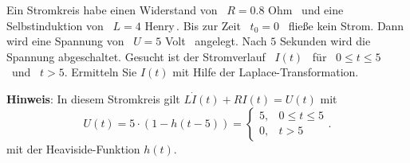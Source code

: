 {
Ein Stromkreis habe einen Widerstand von \ $R=0.8$ Ohm \ und eine Selbstinduktion von \ $L=4$ Henry\,. Bis zur Zeit \ $t_0=0$ \ fließe kein Strom. Dann wird eine Spannung von \ $U=5$ Volt \ angelegt. Nach $5$ Sekunden wird
die Spannung abgeschaltet. Gesucht ist der Stromverlauf \
$I(t)$ \ für \ $0 \le t \le 5$ \ und \ $t > 5$. 
Ermitteln Sie $I(t)$ mit Hilfe der Laplace-Transformation. 

\textbf{Hinweis}: In diesem Stromkreis gilt $L\dot I(t) + RI(t)=U(t)$ mit
$$U(t)=5\cdot(1-h(t-5))=\left\{\begin{array}{ll}
5,&0\leq t\leq 5\\
0,& t>5
\end{array}.\right.$$
mit der Heaviside-Funktion $h(t)$. 
}

